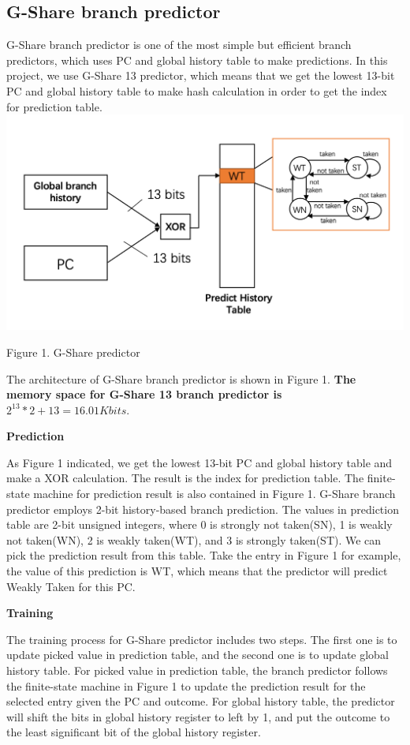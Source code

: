 \documentclass[conference]{IEEEtran}
\begin{document}
\subsection{G-Share branch predictor}
G-Share branch predictor is one of the most simple but efficient branch predictors, which uses PC and global history table to make predictions. In this project, we use G-Share 13 predictor, which means that 
we get the lowest 13-bit PC and global history table to make hash calculation in order to get the index for prediction table. 
\includegraphics[width=\linewidth]{g-share.png}
\begin{center}
  {\small Figure 1. G-Share predictor}
\end{center}

The architecture of G-Share branch predictor is shown in Figure 1. \textbf{The memory space for G-Share 13 branch predictor is $2^{13}*2+13 = 16.01K bits$}. 

\begin{center}
  \textbf{Prediction}
\end{center}

As Figure 1 indicated, we get the lowest 13-bit PC and global history table and make a XOR calculation. The result is the index for prediction table.
The finite-state machine for prediction result is also contained in Figure 1. G-Share branch predictor employs 2-bit 
history-based branch prediction. The values in prediction table are 2-bit unsigned integers, 
where 0 is strongly not taken(SN), 1 is weakly not taken(WN), 2 is weakly taken(WT), and 3 is strongly taken(ST). We can pick the prediction result from this table. 
Take the entry in Figure 1 for example, the value of this prediction is WT, which means that the predictor will predict Weakly Taken for this PC.


\begin{center}
  \textbf{Training}
\end{center}
The training process for G-Share predictor includes two steps. The first one is to update picked value in prediction table, and the second one is to update global history table. 
For picked value in prediction table, the branch predictor follows the finite-state machine in Figure 1 to update the prediction result for the selected entry given the PC and outcome. 
For global history table, the predictor will shift the bits in global history register to left by 1, and put the outcome to the least significant bit of the global history register. 
\end{document}
